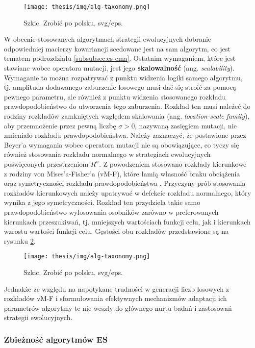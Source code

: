      \begin{figure}[h]
        \centering
        \texttt{[image: thesis/img/alg-taxonomy.png]}
        \caption{Szkic. Zrobić po polsku, svg/eps.}
        \label{fig:poziomice}
    \end{figure}
    W obecnie stosowanych algorytmach strategii ewolucyjnych dobranie odpowiedniej macierzy kowariancji scedowane jest na sam algorytm, co jest tematem podrozdziału 
    \ref{subsubsec:es-cma}.
    Ostatnim wymaganiem, które jest stawiane wobec operatora mutacji, jest jego \textbf{skalowalność} (ang. \textit{scalability}). Wymaganie to można rozpatrywać z punktu widzenia logiki samego algorytmu, tj. amplituda dodawanego zaburzenie losowego musi dać się stroić za pomocą pewnego parametru, ale również z punktu widzenia stosowanego rozkładu prawdopodobieństwo do utworzenia tego zaburzenia. Rozkład ten musi należeć do rodziny rozkładów zamkniętych względem skalowania (ang. \textit{location-scale family}), aby przemnożenie przez pewną liczbę $\sigma >0$, nazywaną zasięgiem mutacji, nie zmieniało rozkładu prawdopodobieństwa. 
    Należy zaznaczyć, że postawione przez Beyer'a wymagania wobec operatora mutacji nie są obowiązujące, co tyczy się również stosowania rozkładu normalnego w strategiach ewolucyjnych poświęconych przestrzeniom $R^{n}$. Z powodzeniem stosowano rozkłady kierunkowe z rodziny von Mises'a-Fisher'a (vM-F), które łamią własność braku obciążenia oraz symetryczności rozkładu prawdopodobieństwa \source. Przyczyny prób stosowania rozkładów kierunkowych należy upatrywać w defekcie rozkładu normalnego, który wynika z jego symetryczności. Rozkład ten przydziela takie samo prawdopodobieństwo wylosowania osobników zarówno w preferowanych kierunkach przeszukiwań, tj. mniejszych wartościach funkcji celu, jak i kierunkach wzrostu wartości funkcji celu. Gęstości obu rozkładów przedstawione są na rysunku \ref{fig:vM-F}.
     \begin{figure}[h]
        \centering
        \texttt{[image: thesis/img/alg-taxonomy.png]}
        \caption{Szkic. Zrobić po polsku, svg/eps.}
        \label{fig:vM-F}
    \end{figure}
    Jednakże ze względu na napotykane trudności w generacji liczb losowych z rozkładów vM-F i sformułowania efektywnych mechanizmów adaptacji ich parametrów algorytmy te nie weszły do głównego nurtu badań i zastosowań strategii ewolucyjnych. 
    
\subsubsection{Zbieżność algorytmów ES}

